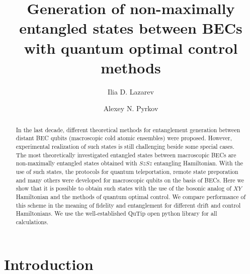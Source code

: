 \documentclass[
aps,%
12pt,%
final,%
notitlepage,%
oneside,%
onecolumn,%
nobibnotes,%
nofootinbib,%
superscriptaddress,%
noshowpacs,%
centertags]%
{revtex4}
\begin{document}
\title{Generation of non-maximally entangled states between BECs with quantum optimal control methods}

\author{Ilia D. Lazarev}

\author{Alexey N. Pyrkov}



\begin{abstract}

In the last decade, different theoretical methods for entanglement generation between distant BEC qubits (macroscopic cold atomic ensembles) were proposed. However, experimental realization of such states is still challenging beside some special cases. The most theoretically investigated entangled states between macroscopic BECs are non-maximally entangled states obtained with $SzSz$ entangling Hamiltonian. With the use of such states, the protocols for quantum teleportation, remote state preporation and many others were developed for macroscopic qubits on the basis of BECs. Here we show that it is possible to obtain such states with the use of the bosonic analog of $XY$ Hamiltonian and the methods of quantum optimal control. We compare performance of this scheme in the meaning of fidelity and entanglement for different drift and control Hamiltonians. We use the well-established QuTip open python library for all calculations.

\end{abstract}

\maketitle

\section{Introduction}
\end{document}

